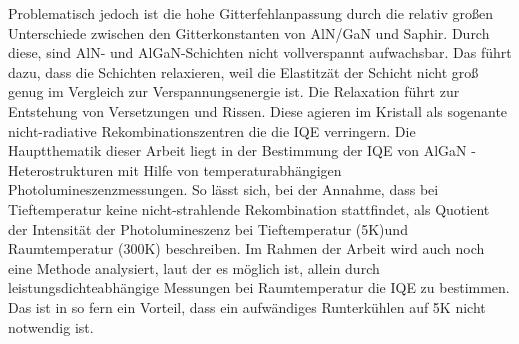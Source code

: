 Problematisch jedoch ist die hohe Gitterfehlanpassung durch die relativ großen Unterschiede zwischen den Gitterkonstanten von AlN/GaN und Saphir.
Durch diese, sind AlN- und AlGaN-Schichten nicht vollverspannt aufwachsbar. Das führt dazu, dass die Schichten relaxieren, weil die Elastitzät der Schicht nicht groß genug im Vergleich zur Verspannungsenergie ist. Die Relaxation führt zur Entstehung von Versetzungen und Rissen. Diese agieren im Kristall als sogenante nicht-radiative Rekombinationszentren die die 
IQE verringern. 
\newline 
Die Hauptthematik dieser Arbeit liegt in der  Bestimmung der IQE von AlGaN - Heterostrukturen mit Hilfe von temperaturabhängigen Photolumineszenzmessungen. So lässt sich, bei der Annahme, dass bei Tieftemperatur keine nicht-strahlende Rekombination stattfindet, als Quotient der Intensität der Photolumineszenz bei Tieftemperatur (5K)und Raumtemperatur (300K) beschreiben. Im Rahmen der Arbeit wird auch noch eine Methode analysiert, laut der es möglich ist, allein durch leistungsdichteabhängige Messungen bei Raumtemperatur die IQE zu bestimmen. Das ist in so fern ein Vorteil, dass ein aufwändiges Runterkühlen auf 5K nicht notwendig ist. 














